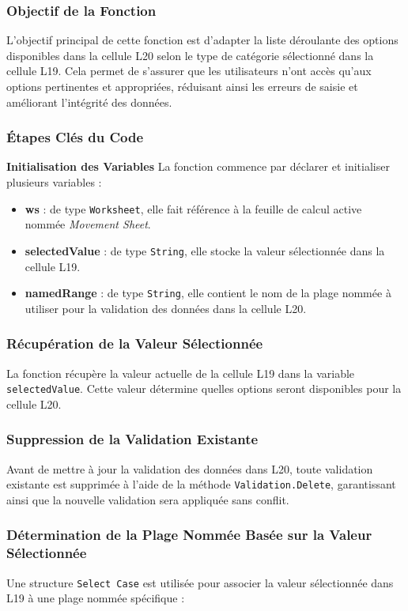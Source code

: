 \documentclass[a4paper, oneside, 12pt, final]{extreport}
\begin{document}
\subsubsection{Objectif de la Fonction}
L'objectif principal de cette fonction est d'adapter la liste déroulante des options disponibles dans la cellule L20 selon le type de catégorie sélectionné dans la cellule L19. Cela permet de s'assurer que les utilisateurs n'ont accès qu'aux options pertinentes et appropriées, réduisant ainsi les erreurs de saisie et améliorant l'intégrité des données.

\subsubsection{Étapes Clés du Code}

\textbf{Initialisation des Variables}
La fonction commence par déclarer et initialiser plusieurs variables :

\begin{itemize}
    \item \textbf{ws} : de type \texttt{Worksheet}, elle fait référence à la feuille de calcul active nommée \textit{Movement Sheet}.
    \item \textbf{selectedValue} : de type \texttt{String}, elle stocke la valeur sélectionnée dans la cellule L19.
    \item \textbf{namedRange} : de type \texttt{String}, elle contient le nom de la plage nommée à utiliser pour la validation des données dans la cellule L20.
\end{itemize}

\subsubsection{Récupération de la Valeur Sélectionnée}
La fonction récupère la valeur actuelle de la cellule L19 dans la variable \texttt{selectedValue}. Cette valeur détermine quelles options seront disponibles pour la cellule L20.

\subsubsection{Suppression de la Validation Existante}
Avant de mettre à jour la validation des données dans L20, toute validation existante est supprimée à l'aide de la méthode \texttt{Validation.Delete}, garantissant ainsi que la nouvelle validation sera appliquée sans conflit.

\subsubsection{Détermination de la Plage Nommée Basée sur la Valeur Sélectionnée}
Une structure \texttt{Select Case} est utilisée pour associer la valeur sélectionnée dans L19 à une plage nommée spécifique :
\end{document}
